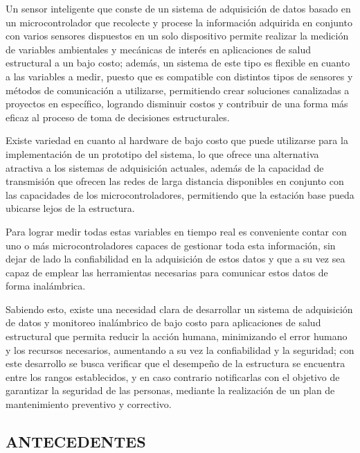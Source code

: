 \documentclass[12pt,letterpaper]{article}
\begin{document}
\vspace{1cm}


Un sensor inteligente que conste de un sistema de adquisición de datos basado en un microcontrolador que recolecte y procese la información adquirida en conjunto con varios sensores dispuestos en un solo dispositivo permite realizar la medición de variables ambientales y mecánicas de interés en aplicaciones de salud estructural a un bajo costo; además, un sistema de este tipo es flexible en cuanto a las variables a medir, puesto que es compatible con distintos tipos de sensores y métodos de comunicación a utilizarse, permitiendo crear soluciones canalizadas a proyectos en específico, logrando disminuir costos y contribuir de una forma más eficaz al proceso de toma de decisiones estructurales.

Existe variedad en cuanto al hardware de bajo costo que puede utilizarse para la implementación de un prototipo del sistema, lo que ofrece una alternativa atractiva a los sistemas de adquisición actuales, además de la capacidad de transmisión que ofrecen las redes de larga distancia disponibles en conjunto con las capacidades de los microcontroladores, permitiendo que la estación base pueda ubicarse lejos de la estructura.

Para lograr medir todas estas variables en tiempo real es conveniente contar con uno o más microcontroladores capaces de gestionar toda esta información, sin dejar de lado la confiabilidad en la adquisición de estos datos y que a su vez sea capaz de emplear las herramientas necesarias para comunicar estos datos de forma inalámbrica.

Sabiendo esto, existe una necesidad clara de desarrollar un sistema de adquisición de datos y monitoreo inalámbrico de bajo costo para aplicaciones de salud estructural que permita reducir la acción humana, minimizando el error humano y los recursos necesarios, aumentando a su vez la confiabilidad y la seguridad; con este desarrollo se busca verificar que el desempeño de la estructura se encuentra entre los rangos establecidos, y en caso contrario notificarlas con el objetivo de garantizar la seguridad de las personas, mediante la realización de un plan de mantenimiento preventivo y correctivo.


\newpage


\begin{center}
	\section*{ANTECEDENTES}
\end{center}
\end{document}
